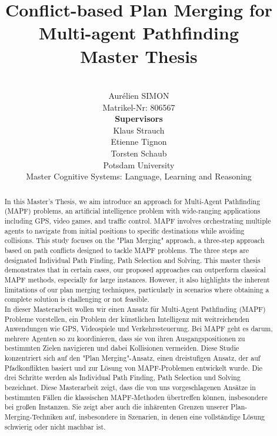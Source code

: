 \documentclass{report}
\title{%
\Huge{Conflict-based Plan Merging for Multi-agent Pathfinding}\\[0.2cm]
\Large{Master Thesis}
}
\author{
\\[1.5cm] \LARGE{Aurélien SIMON}
\\[0.2cm] \small{Matrikel-Nr: 806567 }
\\[1cm] \textbf{Supervisors}
\\[0.2cm] Klaus Strauch 
\\[0.2cm] Etienne Tignon
\\[0.2cm] Torsten Schaub
\\[2cm] \Large{Potsdam University}
\\[0.4cm] Master Cognitive Systems: Language, Learning and Reasoning 
\\[1cm]
}
\theoremstyle{definition}
\begin{document}
\pagestyle{fancy}

\maketitle


\fancyhead{} %


\newpage

\begin{abstract}
    
    In this Master's Thesis, we aim introduce an approach for Multi-Agent Pathfinding (MAPF) problems, an artificial intelligence problem with wide-ranging applications including GPS, video games, and traffic control. MAPF involves orchestrating multiple agents to navigate from initial positions to specific destinations while avoiding collisions. This study focuses on the "Plan Merging" approach, a three-step approach based on path conflicts designed to tackle MAPF problems. The three steps are designated Individual Path Finding, Path Selection and Solving. This master thesis demonstrates that in certain cases, our proposed approaches can outperform classical MAPF methods, especially for large instances. However, it also highlights the inherent limitations of our plan merging techniques, particularly in scenarios where obtaining a complete solution is challenging or not feasible.
    \\[1cm]
    \indent In dieser Masterarbeit wollen wir einen Ansatz für Multi-Agent Pathfinding (MAPF) Probleme vorstellen, ein Problem der künstlichen Intelligenz mit weitreichenden Anwendungen wie GPS, Videospiele und Verkehrssteuerung. Bei MAPF geht es darum, mehrere Agenten so zu koordinieren, dass sie von ihren Ausgangspositionen zu bestimmten Zielen navigieren und dabei Kollisionen vermeiden. Diese Studie konzentriert sich auf den "Plan Merging"-Ansatz, einen dreistufigen Ansatz, der auf Pfadkonflikten basiert und zur Lösung von MAPF-Problemen entwickelt wurde. Die drei Schritte werden als Individual Path Finding, Path Selection und Solving bezeichnet. Diese Masterarbeit zeigt, dass die von uns vorgeschlagenen Ansätze in bestimmten Fällen die klassischen MAPF-Methoden übertreffen können, insbesondere bei großen Instanzen. Sie zeigt aber auch die inhärenten Grenzen unserer Plan-Merging-Techniken auf, insbesondere in Szenarien, in denen eine vollständige Lösung schwierig oder nicht machbar ist.
    
\end{abstract}
\end{document}

